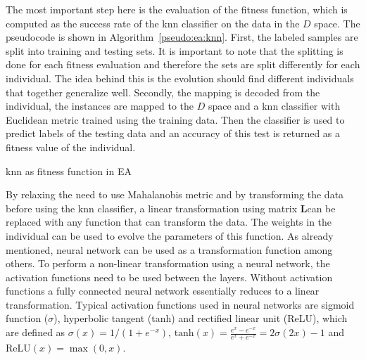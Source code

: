 \documentclass[12pt,a4paper]{report}
\begin{document}
The most important step here is the evaluation of the fitness function, which is computed as the success rate of the \ac{knn} classifier on the data in the $D$ space. The pseudocode is shown in Algorithm~\ref{pseudo:ea:knn}. First, the labeled samples are split into training and testing sets. It is important to note that the splitting is done for each fitness evaluation and therefore the sets are split differently for each individual. The idea behind this is the evolution should find different individuals that together generalize well. Secondly, the mapping is decoded from the individual, the instances are mapped to the $D$ space and a \ac{knn} classifier with Euclidean metric trained using the training data. Then the classifier is used to predict labels of the testing data and an accuracy of this test is returned as a fitness value of the individual.

\begin{algorithm}[t]
\caption{\ac{knn} as fitness function in EA} \label{pseudo:ea:knn}
\DontPrintSemicolon
\LinesNumbered
{}
\end{algorithm} 

By relaxing the need to use Mahalanobis metric and by transforming the data before using the \ac{knn} classifier, a linear transformation using matrix $\bm{L}$can be replaced with any function that can transform the data. The weights in the individual can be used to evolve the parameters of this function. As already mentioned, neural network can be used as a transformation function among others. To perform a non-linear transformation using a neural network, the activation functions need to be used between the layers. Without activation functions a fully connected neural network essentially reduces to a linear transformation. Typical activation functions used in neural networks are sigmoid function ($\sigma$), hyperbolic tangent (tanh) and rectified linear unit (ReLU), which are defined as $\sigma(x) = 1/(1+e^{-x})$, $\text{tanh}(x) = \frac{e^x-e^{-x}}{e^x+e^{-x}} = 2\sigma(2x)-1$ and $\text{ReLU}(x) = \max(0,x)$.
\end{document}

